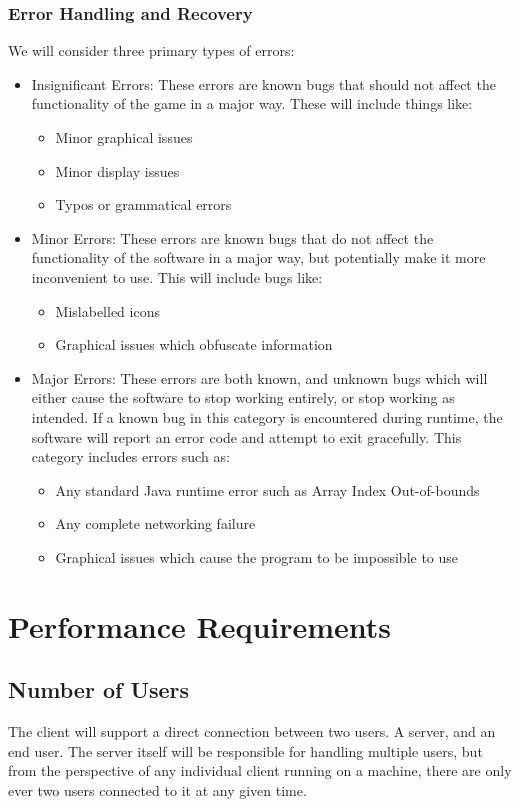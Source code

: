 \documentclass[12pt]{article}
\begin{document}
\subsubsection{Error Handling and Recovery}

We will consider three primary types of errors:

\begin{itemize}
\item Insignificant Errors: These errors are known bugs that should not affect the
functionality of the game in a major way. These will include things like:
	\begin{itemize}
	\item Minor graphical issues
	\item Minor display issues
	\item Typos or grammatical errors
	\end{itemize}

\item Minor Errors: These errors are known bugs that do not affect the functionality
of the software in a major way, but potentially make it more inconvenient to use.
This will include bugs like:
	\begin{itemize}
	\item Mislabelled icons
	\item Graphical issues which obfuscate information
	\end{itemize}
	
\item Major Errors: These errors are both known, and unknown bugs which will either
cause the software to stop working entirely, or stop working as intended. If a known
bug in this category is encountered during runtime, the software will report an error
code and attempt to exit gracefully. This category includes errors such as:
	\begin{itemize}
	\item Any standard Java runtime error such as Array Index Out-of-bounds
	\item Any complete networking failure
	\item Graphical issues which cause the program to be impossible to use
	\end{itemize}
\end{itemize}

\section{Performance Requirements}
\subsection{Number of Users}
The client will support a direct connection between two users.  A server, and
an end user.  The server itself will be responsible for handling multiple users,
but from the perspective of any individual client running on a machine, there
are only ever two users connected to it at any given time.
\end{document}
